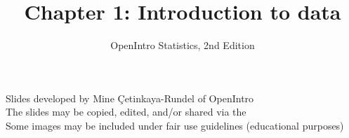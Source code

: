 \documentclass[slidestop,compress,mathserif]{beamer}
\title[Chp 1: Intro. to data]{Chapter 1: Introduction to data}
\author{OpenIntro Statistics, 2nd Edition}
\institute{}
\date{}
\begin{document}


\begin{frame}

\titlepage

{\footnotesize Slides developed by Mine \c{C}etinkaya-Rundel of OpenIntro \\
The slides may be copied, edited, and/or shared via the  \\
Some images may be included under fair use guidelines (educational purposes)}

\end{frame}











\end{document}
